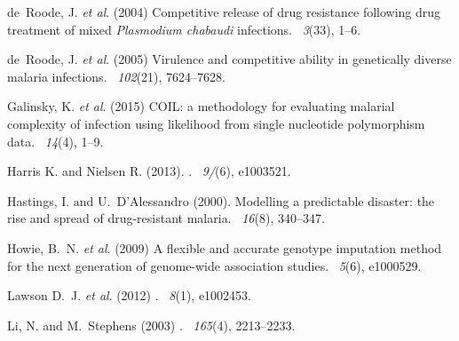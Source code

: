 \documentclass{bioinfo}
\begin{document}
\begin{thebibliography}{}
de~Roode, J. {\em et al}. (2004)
\newblock Competitive release of drug resistance following drug treatment of mixed {\it Plasmodium chabaudi} infections.
~{\em 3\/}(33), 1--6.

de~Roode, J. {\em et al}. (2005)
\newblock Virulence and competitive ability in genetically diverse malaria infections.
~{\em 102\/}(21), 7624--7628.

Galinsky, K. {\em et al}. (2015)
\newblock COIL: a methodology for evaluating malarial complexity of infection using likelihood from single nucleotide polymorphism data.
~{\em14\/}(4), 1--9.

Harris K. and Nielsen R. (2013).
.
~{\em9/}(6), e1003521.

Hastings, I. and U.~D'Alessandro (2000).
\newblock Modelling a predictable disaster: the rise and spread of drug-resistant malaria.
~{\em 16\/}(8), 340--347.

Howie, B.~N. {\em et al}. (2009)
\newblock A flexible and accurate genotype imputation method for the next generation of genome-wide association studies.
~{\em 5\/}(6), e1000529.

Lawson D.~J. {\em et al}. (2012)
.
~{\em 8\/}(1), e1002453.

Li, N. and M.~Stephens (2003)
.
~{\em 165\/}(4), 2213--2233.


\end{thebibliography}
\end{document}
